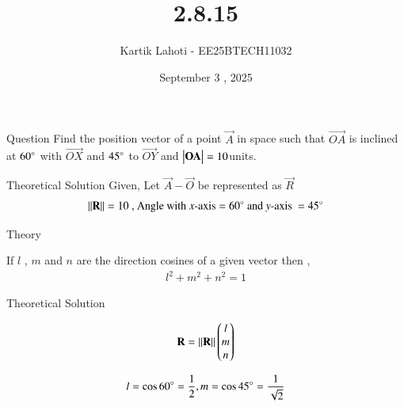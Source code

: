 \documentclass{beamer}
\title %
{2.8.15}
\date{September 3 , 2025}
\author 
{Kartik Lahoti - EE25BTECH11032}
\begin{document}
\frame{\titlepage}
\begin{frame}{Question}
Find the position vector of a point $\vec{A}$ in space such that $\vec{OA}$ is inclined at $60\degree$ with $\vec{OX}$ and $45\degree$ to $\vec{OY}$ and $\begin{vmatrix}\mathbf{OA}\end{vmatrix} = 10 $units.
\end{frame}



\begin{frame}{Theoretical Solution}
Given,
Let $\vec{A} - \vec{O}$ be represented as $\vec{R}$
\begin{align}
    \left\lVert\mathbf{R}\right\rVert = 10 \text{ , Angle with } x\text{-axis} = 60\degree \text{ and } y\text{-axis } = 45\degree
\end{align}

\end{frame}

\begin{frame}{Theory}

If $l$ , $m$ and $n$ are the direction cosines of a given vector then , 
\begin{align}
    l^2 + m^2 + n^2 = 1 
\end{align}

\end{frame}
\begin{frame}{Theoretical Solution}

\begin{align}
    \mathbf{R} = \left\lVert\mathbf{R}\right\rVert \begin{pmatrix}l \\ m \\ n\end{pmatrix}
\end{align}

\begin{align}
    l = \cos{60\degree} = \frac{1}{2} , m = \cos{45\degree} = \frac{1}{\sqrt{2}}
\end{align}
\end{frame}
\end{document}
